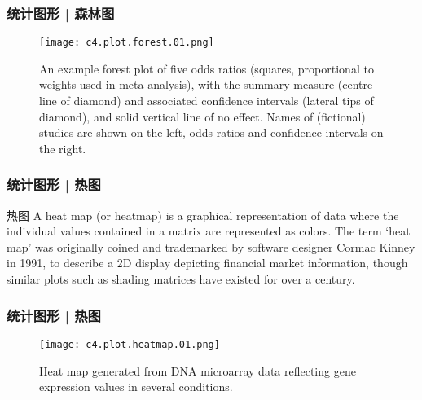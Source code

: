 \begin{frame}
  \frametitle{统计图形 | 森林图}
  \begin{figure}
    \centering
    \texttt{[image: c4.plot.forest.01.png]}
    \caption{An example forest plot of five odds ratios (squares, proportional to weights used in meta-analysis), with the summary measure (centre line of diamond) and associated confidence intervals (lateral tips of diamond), and solid vertical line of no effect. Names of (fictional) studies are shown on the left, odds ratios and confidence intervals on the right.}
  \end{figure}
\end{frame}

\begin{frame}
  \frametitle{统计图形 | 热图}
  \begin{block}{热图}
    A heat map (or heatmap) is a graphical representation of data where the individual values contained in a matrix are represented as colors. The term `heat map' was originally coined and trademarked by software designer Cormac Kinney in 1991, to describe a 2D display depicting financial market information, though similar plots such as shading matrices have existed for over a century.
  \end{block}
\end{frame}

\begin{frame}
  \frametitle{统计图形 | 热图}
  \begin{figure}
    \centering
    \texttt{[image: c4.plot.heatmap.01.png]}
    \caption{Heat map generated from DNA microarray data reflecting gene expression values in several conditions.}
  \end{figure}
\end{frame}

